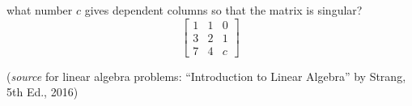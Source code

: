 \documentclass[addpoints]{exam}
\begin{document}
\begin{questions}
	 
	 \question what number $c$ gives dependent columns so that the matrix is singular?
	 \begin{equation*}
	  \begin{bmatrix} 1 & 1 & 0 \\ 3 & 2 & 1\\ 7 & 4 & c \end{bmatrix} 
	 \end{equation*}
	 
 \end{questions}
 
 (\emph{source} for linear algebra problems: ``Introduction to Linear Algebra'' by Strang, 5th Ed., 2016)
\end{document}
